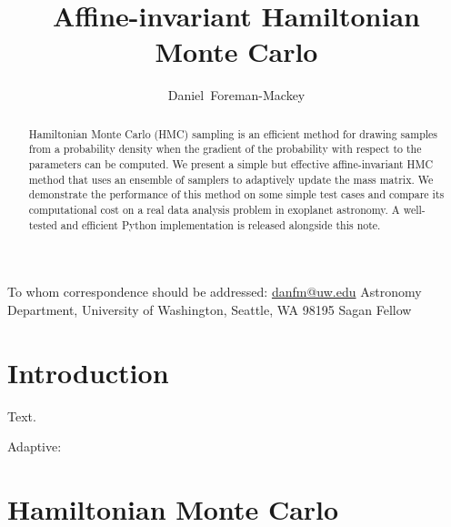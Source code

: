 \documentclass[12pt,preprint]{aastex}
\begin{document}
\title{%
    Affine-invariant Hamiltonian Monte Carlo
}

\newcommand{\uw}{2}
\newcommand{\sagan}{3}
\author{%
    Daniel~Foreman-Mackey\altaffilmark{1,\uw,\sagan}
}
         {To whom correspondence should be addressed:
                          \url{danfm@uw.edu}}
\altaffiltext{\uw}       {Astronomy Department, University of Washington,
                          Seattle, WA 98195}
\altaffiltext{\sagan}    {Sagan Fellow}


\begin{abstract}

Hamiltonian Monte Carlo (HMC) sampling is an efficient method for drawing
samples from a probability density when the gradient of the probability with
respect to the parameters can be computed.
We present a simple but effective affine-invariant HMC method that uses an
ensemble of samplers to adaptively update the mass matrix.
We demonstrate the performance of this method on some simple test cases and
compare its computational cost on a real data analysis problem in exoplanet
astronomy.
A well-tested and efficient Python implementation is released alongside this
note.

\end{abstract}


\section{Introduction}

Text. \citep{Foreman-Mackey:2013}

Adaptive: \citet{Girolami:2011, Wang:2013, Hoffman:2014}

\section{Hamiltonian Monte Carlo}
\end{document}
